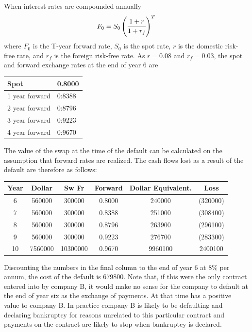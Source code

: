 \documentclass[12pt,a4paper]{exam}
\begin{document}
\begin{questions}
\begin{solution}
When interest rates are compounded annually
\begin{equation*}
	F_0 = S_0\left(\cfrac{1+r}{1+r_f}\right)^T
\end{equation*}
where $F_0$ is the T-year forward rate, $S_0$ is the spot rate, $r$ is the domestic risk-free rate, and $r_f$ is the foreign risk-free rate. As $r = 0.08$ and $r_f = 0.03$, the spot and forward
exchange rates at the end of year 6 are

\begin{center}
	\begin{tabular}{|l|l|}
\hline
Spot & 0.8000 \\ \hline
1 year forward & 0:8388 \\ \hline
2 year forward & 0:8796 \\ \hline
3 year forward & 0:9223 \\ \hline
4 year forward & 0:9670 \\ \hline
	\end{tabular}
\end{center}

The value of the swap at the time of the default can be calculated on the assumption that forward rates are realized. The cash flows lost as a result of the default are therefore as follows:

\begin{center}
	\begin{tabular}{|c|c|c|c|c|c|}
\hline
Year & Dollar& Sw Fr & Forward &Dollar Equivalent. & Loss \\ \hline
6 &560000& 300000& 0.8000& 240000 & (320000) \\ \hline
7 &560000& 300000& 0.8388& 251000 & (308400) \\ \hline
8 &560000& 300000& 0.8796& 263900 & (296100) \\ \hline
9 &560000& 300000& 0.9223& 276700 & (283300) \\ \hline
10& 7560000& 10300000& 0.9670& 9960100 & 2400100 \\ \hline
	\end{tabular}
\end{center}

Discounting the numbers in the final column to the end of year 6 at 8\% per annum, the cost of the default is 679800. Note that, if this were the only contract entered into by company B, it would make no sense for the company to default at the end of year six as the exchange of payments. At that time has a positive value to company B.
In practice company B is likely to be defaulting and declaring bankruptcy for reasons unrelated to this particular contract and payments on the contract are likely to stop when bankruptcy is declared.
\end{solution}


\end{questions}
\end{document}
